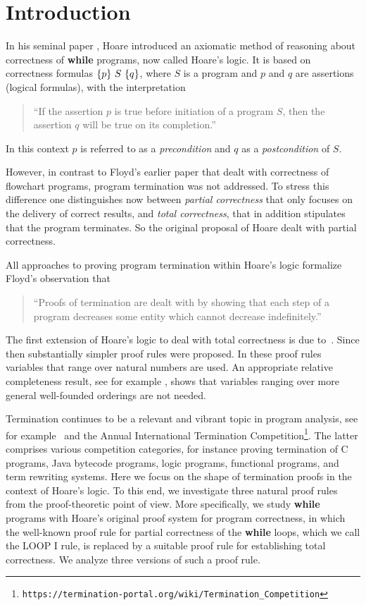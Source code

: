 \documentclass[manuscript, screen, review]{acmart}
\begin{document}
\section{Introduction}

In his seminal paper \cite{Hoa69}, Hoare introduced an axiomatic method of reasoning
about correctness of \textbf{while} programs, now called Hoare's logic. 
It is based on correctness formulas
$\mbox{$\{{p}\}\ {S}\ \{{q}\}$}$, where $S$ is a program and $p$ and $q$ are assertions
(logical formulas), with the interpretation
   \begin{quote}
   ``If the assertion $p$ is true before initiation of a program $S$,
     then the assertion $q$ will be true on its completion.''
   \end{quote}
In this context $p$ is referred to as a \emph{precondition} and $q$ as 
a \emph{postcondition} of $S$.

However, in contrast to Floyd's earlier paper \cite{Flo67a} that dealt
with correctness of flowchart programs, program termination was not
addressed. To stress this difference one distinguishes now between
\emph{partial correctness} that only focuses on the delivery of
correct results, and \emph{total correctness}, that in addition
stipulates that the program terminates.  So the original proposal of
Hoare dealt with partial correctness.

All approaches to proving program termination within Hoare’s logic formalize 
Floyd’s \cite{Flo67a} observation that
    \begin{quote}
    ``Proofs of termination are dealt with by showing that each step of a program 
      decreases some entity which cannot decrease indefinitely.”
    \end{quote}

The first extension of Hoare's logic
to deal with total correctness is due to~\cite{MP74}. 
Since then substantially simpler proof rules were proposed.
In these proof rules variables that range over natural numbers are used.
An appropriate relative completeness result, see for example \cite{ABO09}, 
shows that variables ranging over more general well-founded orderings 
are not needed.

Termination continues to be a relevant and vibrant topic in program
analysis, see for example~\cite{CookPR11} and the Annual International
Termination Competition\footnote{
\texttt{https://termination-portal.org/wiki/Termination\_Competition}}.
The latter comprises various competition categories, 
for instance proving termination of 
C programs, Java bytecode programs, logic programs,
functional programs, and term rewriting systems.
Here we focus on the shape of termination proofs in the context of
Hoare's logic. 
To this end, we investigate three natural proof rules 
from the proof-theoretic point of view.
More specifically, we study {\bf while} programs with Hoare's 
original proof system for program correctness, in which the well-known
proof rule for partial correctness of the {\bf while} loops, which we
call the LOOP I rule, is replaced by a suitable proof rule for
establishing total correctness.  We analyze three versions of such a
proof rule. 
\end{document}
